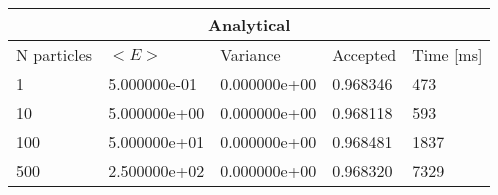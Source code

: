 \begin{tabular}{|l|l|l|l|l|}
\hline 
\multicolumn{5}{|c|}{Analytical}\\ 
\hline 
N particles & $<E>$ & Variance & Accepted & Time [ms]\\ 
 \hline 
1 & 5.000000e-01 & 0.000000e+00 & 0.968346 & 473 \\ 
\hline10 & 5.000000e+00 & 0.000000e+00 & 0.968118 & 593 \\ 
\hline100 & 5.000000e+01 & 0.000000e+00 & 0.968481 & 1837 \\ 
\hline500 & 2.500000e+02 & 0.000000e+00 & 0.968320 & 7329 \\ 
\hline\end{tabular}